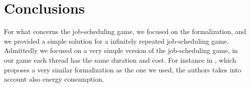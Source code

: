 \section{Conclusions}

For what concerns the job-scheduling game, we focused on the formalization, and
we provided a simple solution for a infinitely repeated job-scheduling game.
Admittedly we focused on a very simple version of the job-scheduling game,
in our game each thread has the same duration and cost.
For instance in \cite{9244046}, which proposes a very similar formalization as the
one we used, the authors takes into account also energy consumption.
